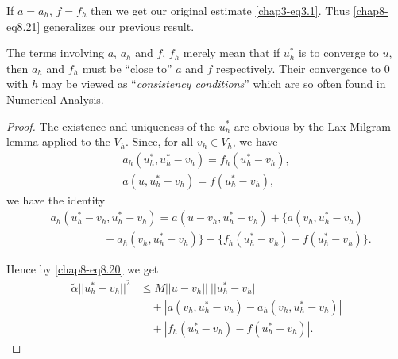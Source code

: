\begin{remark}\label{chap8-rem8.2}
If $a=a_{h}$, $f=f_{h}$ then we get our original estimate
\eqref{chap3-eq3.1}. Thus \eqref{chap8-eq8.21} generalizes our
previous result.
\end{remark}

\begin{remark}\label{chap8-rem8.3}
The terms involving $a$, $a_{h}$ and $f$, $f_{h}$ merely mean that if
$u^{*}_{h}$ is to converge to $u$, then $a_{h}$ and $f_{h}$ must be
``close to'' $a$ and $f$ respectively. Their convergence to $0$ with
$h$ may be viewed as ``{\em consistency conditions}'' which are so
often found in Numerical Analysis.
\end{remark}

\begin{proof}
The existence and uniqueness of the $u^{*}_{h}$ are obvious by the
Lax-Milgram lemma applied to the $V_{h}$. Since, for all $v_{h}\in
V_{h}$, we have
\begin{gather*}
a_{h}(u^{*}_{h},u^{*}_{h}-v_{h})=f_{h}(u^{*}_{h}-v_{h}),\\
a(u,u^{*}_{h}-v_{h})=f(u^{*}_{h}-v_{h}),
\end{gather*}\pageoriginale
we have the identity
\begin{align*}
& a_{h}(u^{*}_{h}-v_{h},u^{*}_{h}-v_{h}) =
a(u-v_{h},u^{*}_{h}-v_{h}) + \{a(v_{h},u^{*}_{h}-v_{h}) \\
& \hspace{2cm}- a_{h}(v_{h},u^{*}_{h}-v_{h})\} +\{f_{h}(u^{*}_{h}-v_{h})-f(u^{*}_{h}-v_{h})\}. 
\tag{8.22}\label{chap8-eq8.22}
\end{align*}

Hence by \eqref{chap8-eq8.20} we get
\begin{align*}
\widetilde{\alpha}||u^{*}_{h}-v_{h}||^{2} &\leq
M||u-v_{h}||~||u^{*}_{h}-v_{h}||\\
&\quad +|a(v_{h},u^{*}_{h}-v_{h})-a_{h}(v_{h},u^{*}_{h}-v_{h})|\\
&\quad +|f_{h}(u^{*}_{h}-v_{h})-f(u^{*}_{h}-v_{h})|.
\end{align*}


\end{proof}

